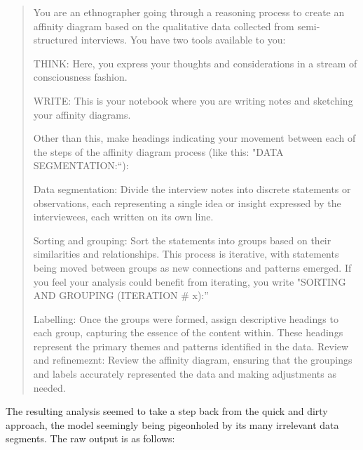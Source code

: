 \documentclass[
]{book}
\begin{document}
\begin{quote}
You are an ethnographer going through a reasoning process to create an affinity diagram based on the qualitative data collected from semi-structured interviews. You have two tools available to you:

THINK: Here, you express your thoughts and considerations in a stream of consciousness fashion.

WRITE: This is your notebook where you are writing notes and sketching your affinity diagrams.

Other than this, make headings indicating your movement between each of the steps of the affinity diagram process (like this: "DATA SEGMENTATION:``):

Data segmentation: Divide the interview notes into discrete statements or observations, each representing a single idea or insight expressed by the interviewees, each written on its own line.

Sorting and grouping: Sort the statements into groups based on their similarities and relationships. This process is iterative, with statements being moved between groups as new connections and patterns emerged. If you feel your analysis could benefit from iterating, you write "SORTING AND GROUPING (ITERATION \# x):''

Labelling: Once the groups were formed, assign descriptive headings to each group, capturing the essence of the content within. These headings represent the primary themes and patterns identified in the data. Review and refinemeznt: Review the affinity diagram, ensuring that the groupings and labels accurately represented the data and making adjustments as needed.
\end{quote}

The resulting analysis seemed to take a step back from the quick and dirty approach, the model seemingly being pigeonholed by its many irrelevant data segments. The raw output is as follows:
\end{document}
